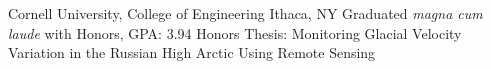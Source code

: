 
        {Cornell University, College of Engineering}
        {Ithaca, NY}
        {Graduated \textit{magna cum laude} with Honors, GPA: 3.94} %
        {Honors Thesis: Monitoring Glacial Velocity Variation in the Russian High Arctic Using Remote Sensing}
